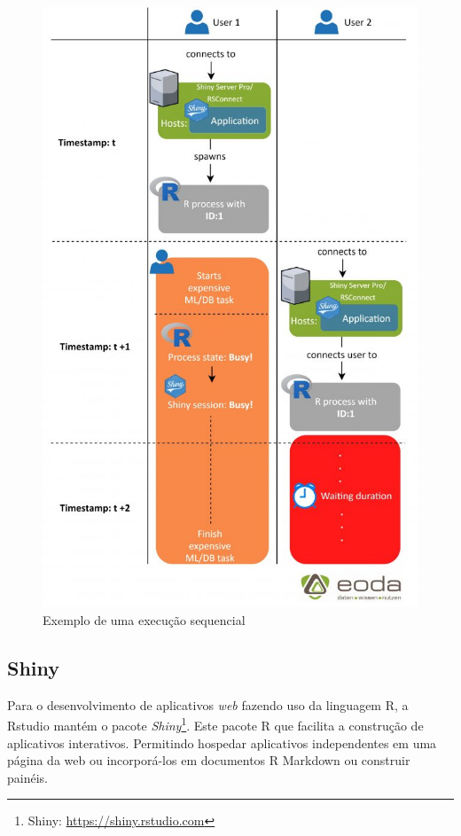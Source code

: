 \documentclass[12pt,english,brazil]{article}
\begin{document}

\begin{figure}[htbp]
  \centering 
  \includegraphics[scale=.4]{figures/single_threads.jpg}
  \caption{Exemplo de uma execução sequencial \cite{singleThreads}}
  \label{singleThreads}
\end{figure}

\subsection{Shiny} \label{sec:Shiny}

Para o desenvolvimento de aplicativos \emph{web} fazendo uso da linguagem R, a Rstudio mantém o pacote \emph{Shiny}\footnote{Shiny: \url{https://shiny.rstudio.com}}. Este pacote R que facilita a construção de aplicativos interativos. Permitindo hospedar aplicativos independentes em uma página da web ou incorporá-los em documentos R Markdown ou construir painéis. 
\end{document}
